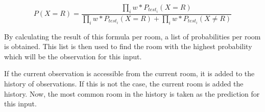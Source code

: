 \begin{equation}
    \label{eq:combine-chances-next-level}
    P(X = R) = \frac{\prod_{i} w * P_{test_i}(X = R)}{\prod_{i} w * P_{test_i}(X = R) + \prod_{i} w * P_{test_i}(X \ne R)}
\end{equation}

By calculating the result of this formula per room, a list of probabilities per room is obtained. This list is then used to find the room with the highest probability which will be the observation for this input.

If the current observation is accessible from the current room, it is added to the history of observations. If this is not the case, the current room is added the history. Now, the most common room in the history is taken as the prediction for this input.
